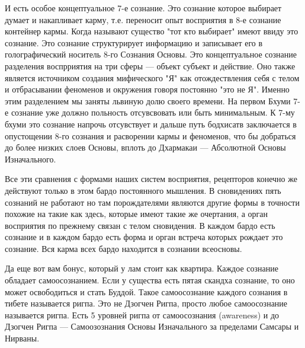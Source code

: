 И есть особое концептуальное 7-е сознание. Это сознание которое выбирает думает и накапливает карму, т.е. переносит опыт восприятия в 8-е сознание контейнер кармы. Когда называют существо "тот кто выбирает" имеют ввиду это сознание. Это сознание структурирует информацию и записывает его в голографический носитель 8-го Сознания Основы. Это концептуальное сознание разделения воспрриятия на три сферы — объект субъект и действие. Оно также является источником создания мифического "Я" как отождествления себя с телом и отбрасывании феноменов и окружения говоря постоянно "это не Я". Именно этим разделением мы заняты львиную долю своего времени. На первом Бхуми 7-е сознание уже должно польность отсувсвовать или быть минимальным. К 7-му бхуми это сознание напрочь отсувствует и дальше путь бодхисатв заключается в опустощении 8-го сознания и расворении кармы и феноменов, что бы добраться до более низких слоев Основы, вплоть до Дхармакаи — Абсолютной Основы Изначального.

Все эти сравнения с формами наших систем восприятия, рецепторов конечно же действуют только в этом бардо постоянного мышления. В сновидениях пять сознаний не работают но там порождателями являются другие формы в точности похожие на такие как здесь, которые имеют такие же очертания, а орган восприятия по прежнему связан с телом сновидения. В каждом бардо есть сознание и в каждом бардо есть форма и орган встреча которых рождает это сознание. Вся карма всех бардо находится в сознании всеосновы.

Да еще вот вам бонус, который у лам стоит как квартира. Каждое сознание обладает самоосознанием. Если у существа есть пятая скандха сознание, то оно может освободиться и стать Буддой. Такое самоосознание каждого сознания в тибете называется ригпа. Это не Дзогчен Ригпа, просто любое самоосознание называется ригпа. Есть 5 уровней ригпа от самоосознания (awareness) и до Дзогчен Ригпа — Самоозознания Основы Изначального за пределами Самсары и Нирваны.

